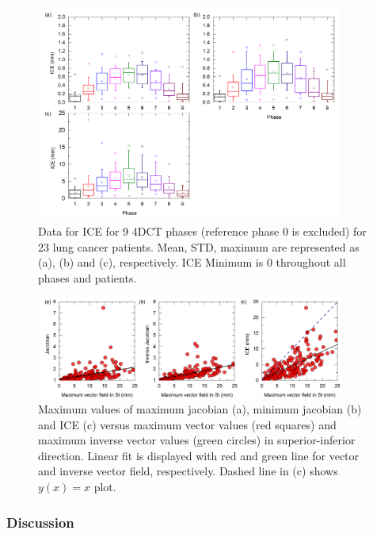 \documentclass[type=dr, dr=rernat, accentcolor=tud7b,colorbacktitle, bigchapter, openright, twoside, 12pt ]{tudthesis}
\begin{document}
\begin{figure}[H]
	\begin{center}		
		\includegraphics[width=0.9\textwidth]{./Images/ICE.png}
		\caption{Data for ICE for 9 4DCT phases (reference phase 0 is excluded) for 23 lung cancer patients. Mean, STD, maximum are represented as (a), (b) and (c), respectively. ICE Minimum is 0 throughout all phases and patients.}
		\label{ice}
	\end{center}
\end{figure}

\begin{figure}[H]
	\begin{center}		
		\includegraphics[width=0.9\textwidth]{./Images/MaxVf.png}
		\caption{Maximum values of maximum jacobian (a), minimum jacobian (b) and ICE (c) versus maximum vector values (red squares) and maximum inverse vector values (green circles) in superior-inferior direction. Linear fit is 
		displayed with red and green line for vector and inverse vector field, respectively. Dashed line in (c) shows $y(x)= x$ plot.}
		\label{maxvf}
	\end{center}
\end{figure}

\subsubsection{Discussion}
\end{document}
